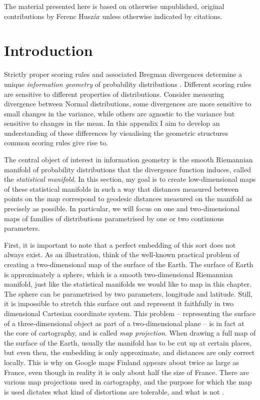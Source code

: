 \begin{summarycontributions}
The material presented here is based on otherwise unpublished, original contributions by Ferenc Husz\'{a}r unless otherwise indicated by citations.
\end{summarycontributions}
\section{Introduction}

Strictly proper scoring rules and associated Bregman divergences determine a unique \emph{information geometry} of probability distributions \citep{Dawid2007,Amari2010}. Different scoring rules are sensitive to different properties of distributions. Consider measuring divergence between Normal distributions, some divergences are more sensitive to small changes in the variance, while others are agnostic to the variance but sensitive to changes in the mean. In this appendix I aim to develop an understanding of these differences by visualising the geometric structures common scoring rules give rise to.

The central object of interest in information geometry is the smooth Riemannian manifold of probability distributions that the divergence function induces, called the \emph{statistical manifold}. In this section, my
goal is to create low-dimensional maps of these statistical manifolds in such a way that distances measured between points on the map correspond to geodesic distances measured on the manifold as precisely as possible. In particular, we will focus on one and two-dimensional maps of families of distributions parametrised by one or two continuous parameters.

First, it is important to note that a perfect embedding of this sort does not always exist. As an illustration, think of the well-known practical problem of creating a two-dimensional map of the surface of the Earth. The surface of Earth is approximately a sphere, which is a smooth two-dimensional Riemannian manifold, just like the statistical manifolds we would like to map in this chapter. The sphere can be parametrised by two parameters, longitude and latitude. Still, it is impossible to stretch this surface out and represent it faithfully in two dimensional Cartesian coordinate system. This problem -- representing the surface of a three-dimensional object as part of a two-dimensional plane -- is in fact at the core of cartography, and is called \emph{map projection}. When drawing a full map of the surface of the Earth, usually the manifold has to be cut up at certain places, but even then, the embedding is only approximate, and distances are only correct locally. This is why on Google maps Finland appears about twice as large as France, even though in reality it is only about half the size of France. There are various map projections used in cartography, and the purpose for which the map is used dictates what kind of distortions are tolerable, and what is not \citep{Fenna2007}.

